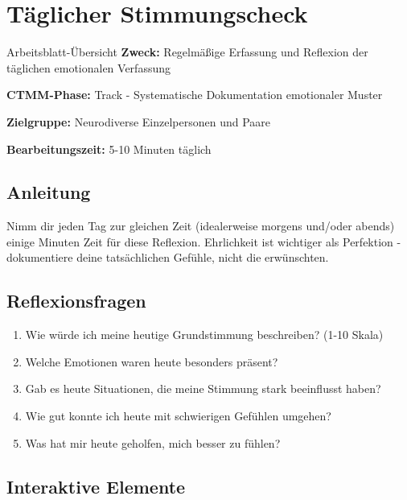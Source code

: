 % 

\section{Täglicher Stimmungscheck}

\begin{ctmmBlueBox}{Arbeitsblatt-Übersicht}
\textbf{Zweck:} Regelmäßige Erfassung und Reflexion der täglichen emotionalen Verfassung

\textbf{CTMM-Phase:} Track - Systematische Dokumentation emotionaler Muster

\textbf{Zielgruppe:} Neurodiverse Einzelpersonen und Paare

\textbf{Bearbeitungszeit:} 5-10 Minuten täglich
\end{ctmmBlueBox}

\subsection{Anleitung}

Nimm dir jeden Tag zur gleichen Zeit (idealerweise morgens und/oder abends) einige Minuten Zeit für diese Reflexion. 
Ehrlichkeit ist wichtiger als Perfektion - dokumentiere deine tatsächlichen Gefühle, nicht die erwünschten.

\subsection{Reflexionsfragen}

\begin{enumerate}
\item Wie würde ich meine heutige Grundstimmung beschreiben? (1-10 Skala)
\item Welche Emotionen waren heute besonders präsent?
\item Gab es heute Situationen, die meine Stimmung stark beeinflusst haben?
\item Wie gut konnte ich heute mit schwierigen Gefühlen umgehen?
\item Was hat mir heute geholfen, mich besser zu fühlen?
\end{enumerate}

\subsection{Interaktive Elemente}

